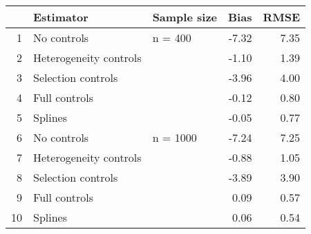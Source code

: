 \begin{table}[ht]
\centering
\begin{tabular}{rllrr}
  \hline
 & Estimator & Sample size & Bias & RMSE \\ 
  \hline
1 & No controls & n = 400 & -7.32 & 7.35 \\ 
  2 & Heterogeneity controls &  & -1.10 & 1.39 \\ 
  3 & Selection controls &  & -3.96 & 4.00 \\ 
  4 & Full controls &  & -0.12 & 0.80 \\ 
  5 & Splines &  & -0.05 & 0.77 \\ 
  6 & No controls & n = 1000 & -7.24 & 7.25 \\ 
  7 & Heterogeneity controls &  & -0.88 & 1.05 \\ 
  8 & Selection controls &  & -3.89 & 3.90 \\ 
  9 & Full controls &  & 0.09 & 0.57 \\ 
  10 & Splines &  & 0.06 & 0.54 \\ 
   \hline
\end{tabular}
\end{table}
